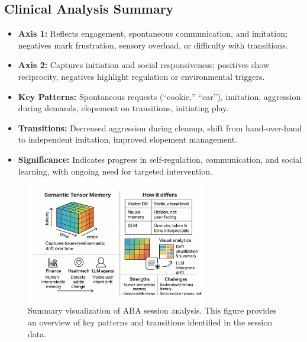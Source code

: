 \documentclass[11pt]{article}
\begin{document}
\subsection{Clinical Analysis Summary}
\begin{itemize}[leftmargin=2em]
    \item \textbf{Axis 1:} Reflects engagement, spontaneous communication, and imitation; negatives mark frustration, sensory overload, or difficulty with transitions.
    \item \textbf{Axis 2:} Captures initiation and social responsiveness; positives show reciprocity, negatives highlight regulation or environmental triggers.
    \item \textbf{Key Patterns:} Spontaneous requests (``cookie,'' ``car''), imitation, aggression during demands, elopement on transitions, initiating play.
    \item \textbf{Transitions:} Decreased aggression during cleanup, shift from hand-over-hand to independent imitation, improved elopement management.
    \item \textbf{Significance:} Indicates progress in self-regulation, communication, and social learning, with ongoing need for targeted intervention.
\end{itemize}

\begin{figure}[h]
    \centering
    \includegraphics[width=0.7\textwidth]{summary_image.png}
    \caption{Summary visualization of ABA session analysis. This figure provides an overview of key patterns and transitions identified in the session data.}
    \label{fig:summary}
\end{figure}
\end{document}
